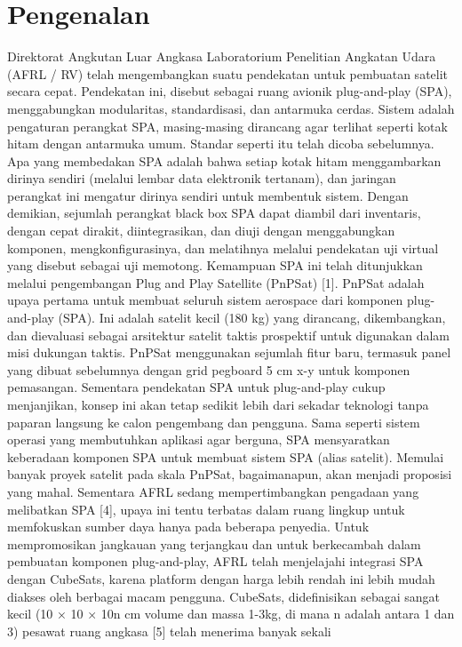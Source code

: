 \section{Pengenalan}
Direktorat Angkutan Luar Angkasa Laboratorium Penelitian Angkatan Udara (AFRL / RV) telah mengembangkan suatu pendekatan untuk pembuatan satelit secara cepat. Pendekatan ini, disebut sebagai ruang avionik plug-and-play (SPA), menggabungkan modularitas, standardisasi, dan antarmuka cerdas. Sistem adalah pengaturan perangkat SPA, masing-masing dirancang agar terlihat seperti kotak hitam dengan antarmuka umum. Standar seperti itu telah dicoba sebelumnya.
Apa yang membedakan SPA adalah bahwa setiap kotak hitam menggambarkan dirinya sendiri (melalui lembar data elektronik tertanam), dan jaringan perangkat ini mengatur dirinya sendiri untuk membentuk sistem. Dengan demikian, sejumlah perangkat black box SPA dapat diambil dari inventaris, dengan cepat dirakit, diintegrasikan, dan diuji dengan menggabungkan komponen, mengkonfigurasinya, dan melatihnya melalui pendekatan uji virtual yang disebut sebagai uji memotong. Kemampuan SPA ini telah ditunjukkan melalui pengembangan Plug and Play Satellite (PnPSat) [1].
PnPSat adalah upaya pertama untuk membuat seluruh sistem aerospace dari komponen plug-and-play (SPA). Ini adalah satelit kecil (180 kg) yang dirancang, dikembangkan, dan dievaluasi sebagai arsitektur satelit taktis prospektif untuk digunakan dalam misi dukungan taktis. PnPSat menggunakan sejumlah fitur baru, termasuk panel yang dibuat sebelumnya dengan grid pegboard 5 cm x-y untuk komponen pemasangan.
Sementara pendekatan SPA untuk plug-and-play cukup menjanjikan, konsep ini akan tetap sedikit lebih dari sekadar teknologi tanpa paparan langsung ke calon pengembang dan pengguna. Sama seperti sistem operasi yang membutuhkan aplikasi agar berguna, SPA mensyaratkan keberadaan komponen SPA untuk membuat sistem SPA (alias satelit). 
Memulai banyak proyek satelit pada skala PnPSat, bagaimanapun, akan menjadi proposisi yang mahal. Sementara AFRL sedang mempertimbangkan pengadaan yang melibatkan SPA [4], upaya ini tentu terbatas dalam ruang lingkup untuk memfokuskan sumber daya hanya pada beberapa penyedia. Untuk mempromosikan jangkauan yang terjangkau dan untuk berkecambah dalam pembuatan komponen plug-and-play, AFRL telah menjelajahi integrasi SPA dengan CubeSats, karena platform dengan harga lebih rendah ini lebih mudah diakses oleh berbagai macam pengguna.
CubeSats, didefinisikan sebagai sangat kecil (10 × 10 × 10n cm
volume dan massa 1-3kg, di mana n adalah antara 1 dan 3)
pesawat ruang angkasa [5] telah menerima banyak sekali
